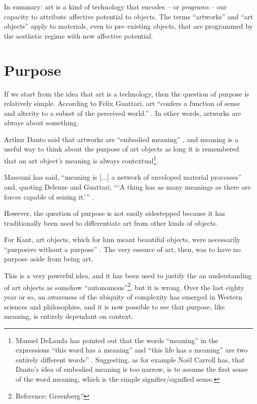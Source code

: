 \documentclass[letter:wpaper]{article}
\begin{document}
    In summary: art is a kind of technology that encodes – or \emph{programs} – our capacity to attribute affective potential to objects. The terms ``artworks'' and ``art objects'' apply to materials, even to pre–existing objects, that are programmed by the aesthetic regime with new affective potential.

    \section{Purpose}

    If we start from the idea that art is a technology, then the question of purpose is relatively simple. According to Felix Guattari, art ``confers a function of sense and alterity to a subset of the perceived world.'' \citep[p.131]{GuattariChsmss1995}. In other words, artworks are always about something.
    
    Arthur Danto said that artworks are ``embodied meaning'' \citep[p.125]{DantoEmbdMnngs2007}, and meaning is a useful way to think about the purpose of art objects as long it is remembered that an art object's meaning is always contextual\footnote{
        Manuel DeLanda has pointed out that the words ``meaning'' in the expressions ``this word has a meaning'' and ``this life has a meaning'' are two entirely different words'' \citep[pp.40–41]{DeLandaCsltyAndMnng2018}. Suggesting, as for example Noël Carroll has, that Danto's idea of embodied meaning is too narrow, is to assume the first sense of the word meaning, which is the simple signifier/signified sense.
    }.
    
    Massumi has said, ``meaning is [...] a network of enveloped material processes'' and, quoting Deleuze and Guattari, ``‘A thing has as many meanings as there are forces capable of seizing it.’'' \citep[p.10]{MassumiAUsrsGdTCptlsmAndSchzphrn1992}.

    However, the question of purpose is not easily sidestepped because it has traditionally been used to differentiate art from other kinds of objects.
    
    For Kant, art objects, which for him meant beautiful objects, were necessarily ``purposive without a purpose'' \citep[p.57]{KantCrtqOfJdgmnt}. The very essence of art, then, was to have no purpose aside from being art.
    
    This is a very powerful idea, and it has been used to justify the an understanding of art objects as somehow ``autonomous''\footnote{
        Reference: Greenberg?
    }, but it is wrong. Over the last eighty year or so, an awareness of the ubiquity of complexity has emerged in Western sciences and philosophies, and it is now possible to see that purpose, like meaning, is entirely dependant on context.
\end{document}
